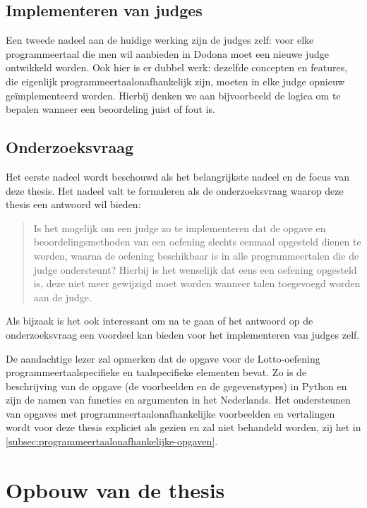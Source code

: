 \subsection{Implementeren van judges}\label{subsec:implementeren-van-judges}

Een tweede nadeel aan de huidige werking zijn de judges zelf: voor elke programmeertaal die men wil aanbieden in Dodona moet een nieuwe judge ontwikkeld worden.
Ook hier is er dubbel werk: dezelfde concepten en features, die eigenlijk programmeertaalonafhankelijk zijn, moeten in elke judge opnieuw geïmplementeerd worden.
Hierbij denken we aan bijvoorbeeld de logica om te bepalen wanneer een beoordeling juist of fout is.

\subsection{Onderzoeksvraag}\label{subsec:onderzoeksvraag}

Het eerste nadeel wordt beschouwd als het belangrijkste nadeel en de focus van deze thesis.
Het nadeel valt te formuleren als de onderzoeksvraag waarop deze thesis een antwoord wil bieden:

\begin{quote}
    Is het mogelijk om een judge zo te implementeren dat de opgave en beoordelingsmethoden van een oefening slechts eenmaal opgesteld dienen te worden, waarna de oefening beschikbaar is in alle programmeertalen die de judge ondersteunt?
    Hierbij is het wenselijk dat eens een oefening opgesteld is, deze niet meer gewijzigd moet worden wanneer talen toegevoegd worden aan de judge.
\end{quote}

Als bijzaak is het ook interessant om na te gaan of het antwoord op de onderzoeksvraag een voordeel kan bieden voor het implementeren van judges zelf.

De aandachtige lezer zal opmerken dat de opgave voor de Lotto-oefening programmeertaalspecifieke en taalspecifieke elementen bevat.
Zo is de beschrijving van de opgave (de voorbeelden en de gegevenstypes) in Python en zijn de namen van functies en argumenten in het Nederlands.
Het ondersteunen van opgaves met programmeertaalonafhankelijke voorbeelden en vertalingen wordt voor deze thesis expliciet als  gezien en zal niet behandeld worden, zij het in \cref{subsec:programmeertaalonafhankelijke-opgaven}.

\section{Opbouw van de thesis}\label{sec:opbouw}

